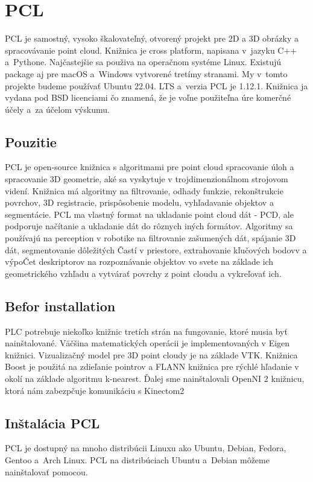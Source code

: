 
\section{PCL}
\noindent   PCL je samostný, vysoko škalovateľný, otvorený projekt pre 2D a 3D obrázky a spracovávanie point cloud. Knižnica je cross platform, napisana v jazyku C++ a Pythone. Najčastejšie sa použiva na operačnom systéme Linux. Existujú package aj pre macOS a Windows vytvorené tretímy stranami. My v tomto projekte budeme používať Ubuntu 22.04. LTS a verzia PCL je  1.12.1. Knižnica ja vydana pod BSD licenciami čo znamená, že je voľne použiteľna úre komerčné účely a za účelom výskumu.
\subsection{Pouzitie}
PCL je open-source knižnica s algoritmami pre point cloud spracovanie úloh a spracovanie 3D geometrie, aké sa vyskytuje v trojdimenzionálnom strojovom videní. Knižnica má algoritmy na filtrovanie, odhady funkzie, rekonštrukcie povrchov, 3D registracie, prispôsobenie modelu, vyhľadavanie objektov a segmentácie. PCL ma vlastný format na ukladanie point cloud dát - PCD, ale podporuje načítanie a ukladanie dát do rôznych iných formátov. 
Algoritmy sa používajú na perception v robotike na filtrovanie zašumených dát, spájanie 3D dát, segmentovanie dôležitých Častí v priestore, extrahovanie kľučových bodovv a výpoČet deskriptorov na rozpoznávanie objektov vo svete na základe ich geometrického vzhľadu a vytvárať povrchy z point cloudu a vykreľovať ich.
\subsection{Befor installation}
PLC potrebuje niekoľko knižnic tretích strán na fungovanie, ktoré musia byť nainštalované. Väčšina matematických operácii je implementovaných v Eigen knižnici. Vizualizačný model pre 3D point cloudy je na základe VTK. Knižnica Boost je použitá na zdieľanie pointrov a FLANN knižnica pre rýchlé hľadanie v okolí na základe algoritmu k-nearest. Ďalej sme nainštalovali OpenNI 2 knižnicu, ktorá nám zabezpčuje komunikáciu s Kinectom2
\subsection{Inštalácia PCL}
PCL je dostupný na mnoho distribúcii Linuxu ako Ubuntu, Debian, Fedora, Gentoo a Arch Linux. PCL na distribúciach Ubuntu a Debian môžeme nainštalovať pomocou.

